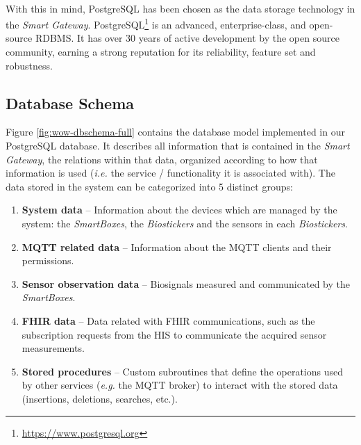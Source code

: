 \paragraph{} With this in mind, PostgreSQL has been chosen as the data storage technology in the \textit{Smart Gateway}. PostgreSQL\footnote{\url{https://www.postgresql.org}} is an advanced, enterprise-class, and open-source \acs{RDBMS}. It has over 30 years of active development by the open source community, earning a strong reputation for its reliability, feature set and robustness.

\subsection{Database Schema}
Figure \ref{fig:wow-dbschema-full} contains the database model implemented in our PostgreSQL database. It describes all information that is contained in the \textit{Smart Gateway}, the relations within that data, organized according to how that information is used (\textit{i.e.} the service / functionality it is associated with). The data stored in the system can be categorized into 5 distinct groups:

\begin{enumerate}
    \item \textbf{System data} -- Information about the devices which are managed by the system: the \textit{SmartBoxes}, the \textit{Biostickers} and the sensors in each \textit{Biostickers}. 
    \item \textbf{\acs{MQTT} related data} -- Information about the \acs{MQTT} clients and their permissions. 
    \item \textbf{Sensor observation data} -- Biosignals measured and communicated by the \textit{SmartBoxes}.
    \item \textbf{\acs{FHIR} data} -- Data related with \acs{FHIR} communications, such as the subscription requests from the \acs{HIS} to communicate the acquired sensor measurements.
    \item \textbf{Stored procedures} -- Custom subroutines that define the operations used by other services (\textit{e.g.} the \acs{MQTT} broker) to interact with the stored data (insertions, deletions, searches, etc.).
\end{enumerate}

\clearpage 

